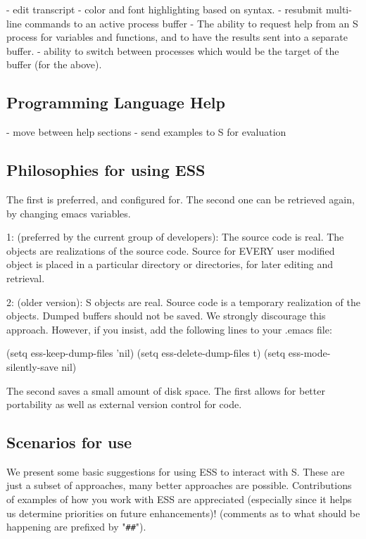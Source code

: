 \documentclass{article}
\begin{document}
- edit transcript
- color and font highlighting based on syntax.
- resubmit multi-line commands to an active process buffer
- The ability to request help from an S process for variables and
  functions, and to have the results sent into a separate buffer.
- ability to switch between processes which would be the target of the 
  buffer (for the above).


\subsection{Programming Language Help}
\label{sec:S:help}

- move between help sections
- send examples to S for evaluation


\subsection{Philosophies for using ESS}
\label{sec:S:philosophy}


The first is preferred, and configured for.  The second one can be
retrieved again, by changing emacs variables.

1: (preferred by the current group of developers):  The source code is 
   real.  The objects are realizations of the source code.  Source
   for EVERY user modified object is placed in a particular directory
   or directories, for later editing and retrieval.

2: (older version): S objects are real.  Source code is a temporary
   realization of the objects.  Dumped buffers should not be saved.
   We strongly discourage this approach.  However, if you insist,
   add the following lines to your .emacs file:

      (setq ess-keep-dump-files 'nil)
      (setq ess-delete-dump-files t)
      (setq ess-mode-silently-save nil)

The second saves a small amount of disk space.  The first allows for
better portability as well as external version control for code.


\subsection{Scenarios for use}
\label{sec:S:scenarios}

We present some basic suggestions for using ESS to interact with S.
These are just a subset of approaches, many better approaches are
possible.  Contributions of examples of how you work with ESS are
appreciated (especially since it helps us determine priorities on
future enhancements)! (comments as to what should be happening are
prefixed by "\verb+##+").
\end{document}
